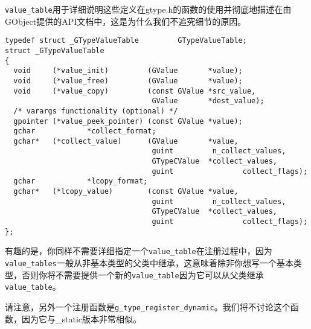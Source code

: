 \verb|value_table|用于详细说明这些定义在gtype.h的函数的使用并彻底地描述在由GObject提供的API文档中，这是为什么我们不追究细节的原因。
\begin{verbatim}
typedef struct _GTypeValueTable         GTypeValueTable;
struct _GTypeValueTable
{
  void     (*value_init)         (GValue       *value);
  void     (*value_free)         (GValue       *value);
  void     (*value_copy)         (const GValue *src_value,
                                  GValue       *dest_value);
  /* varargs functionality (optional) */
  gpointer (*value_peek_pointer) (const GValue *value);
  gchar            *collect_format;
  gchar*   (*collect_value)      (GValue       *value,
                                  guint         n_collect_values,
                                  GTypeCValue  *collect_values,
                                  guint                collect_flags);
  gchar            *lcopy_format;
  gchar*   (*lcopy_value)        (const GValue *value,
                                  guint         n_collect_values,
                                  GTypeCValue  *collect_values,
                                  guint                collect_flags);
};
\end{verbatim}
有趣的是，你同样不需要详细指定一个\verb|value_table|在注册过程中，因为\verb|value_tables|一般从非基本类型的父类中继承，这意味着除非你想写一个基本类型，否则你将不需要提供一个新的\verb|value_table|因为它可以从父类继承\verb|value_table|。

请注意，另外一个注册函数是\verb|g_type_register_dynamic|。我们将不讨论这个函数，因为它与\_static版本非常相似。
